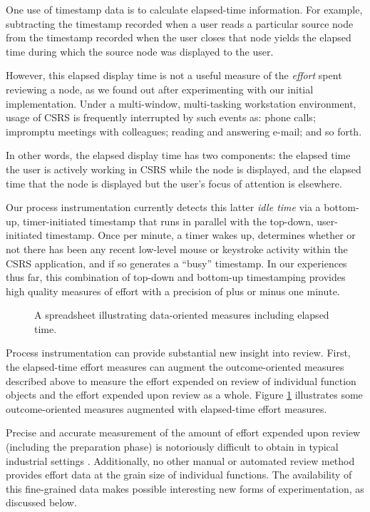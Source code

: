 One use of timestamp data is to calculate elapsed-time information.  For
example, subtracting the timestamp recorded when a user reads a particular
source node from the timestamp recorded when the user closes that node
yields the elapsed time during which the source node was displayed to the
user.

However, this elapsed display time is not a useful measure of the {\em
effort} spent reviewing a node, as we found out after experimenting with
our initial implementation.  Under a multi-window, multi-tasking
workstation environment, usage of CSRS is frequently interrupted by such
events as: phone calls; impromptu meetings with colleagues; reading and
answering e-mail; and so forth.

In other words, the elapsed display time has two components: the elapsed
time the user is actively working in CSRS while the node is displayed, and
the elapsed time that the node is displayed but the user's focus of
attention is elsewhere.

Our process instrumentation currently detects this latter {\em idle time}\/
via a bottom-up, timer-initiated timestamp that runs in parallel with the
top-down, user-initiated timestamp.  Once per minute, a timer wakes up,
determines whether or not there has been any recent low-level mouse or
keystroke activity within the CSRS application, and if so generates a
``busy'' timestamp. In our experiences thus far, this combination of
top-down and bottom-up timestamping provides high quality measures of
effort with a precision of plus or minus one minute.

\begin{figure}                                        
{\centerline{}}
\caption{A spreadsheet illustrating data-oriented measures including elapsed time.}
\label{fig:elapsed-time}
\end{figure}

Process instrumentation can provide substantial new insight into review.
First, the elapsed-time effort measures can augment the outcome-oriented
measures described above to measure the effort expended on review of
individual function objects and the effort expended upon review as a whole.
Figure \ref{fig:elapsed-time} illustrates some outcome-oriented measures
augmented with elapsed-time effort measures.

Precise and accurate measurement of the amount of effort expended upon
review (including the preparation phase) is notoriously difficult to obtain
in typical industrial settings \cite{Freedman90}.  Additionally, no other
manual or automated review method provides effort data at the grain size of
individual functions.  The availability of this fine-grained data makes
possible interesting new forms of experimentation, as discussed below.

